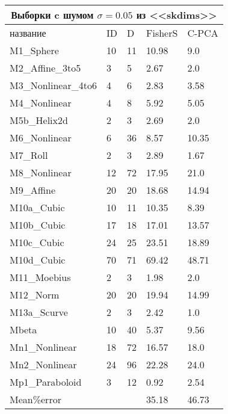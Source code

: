 \documentclass[english, russian]{sobraep}
\begin{document}
\begin{tabular}{
p{2.4cm}|p{0.9cm}|p{0.9cm}|p{0.9cm}|p{0.9cm}  }
 \multicolumn{5}{c}{Выборки c шумом $\sigma = 0.05$ из <<skdims>>} \\
 \hline
 название & ID & D & FisherS& C-PCA\\
 \hline
 M1_Sphere   & 10 & 11 & 10.98 & 9.0\\
M2_Affine_3to5   & 3 & 5 & 2.67 & 2.0\\
M3_Nonlinear_4to6   & 4 & 6 & 2.83 & 3.58\\
M4_Nonlinear   & 4 & 8 & 5.92 & 5.05\\
M5b_Helix2d   & 2 & 3 & 2.69 & 2.0\\
M6_Nonlinear   & 6 & 36 & 8.57 & 10.35\\
M7_Roll   & 2 & 3 & 2.89 & 1.67\\
M8_Nonlinear   & 12 & 72 & 17.95 & 21.0\\
M9_Affine   & 20 & 20 & 18.68 & 14.94\\
M10a_Cubic   & 10 & 11 & 10.35 & 8.39\\
M10b_Cubic   & 17 & 18 & 17.01 & 13.57\\
M10c_Cubic   & 24 & 25 & 23.51 & 18.89\\
M10d_Cubic   & 70 & 71 & 69.42 & 48.71\\
M11_Moebius   & 2 & 3 & 1.98 & 2.0\\
M12_Norm   & 20 & 20 & 19.94 & 14.99\\
M13a_Scurve   & 2 & 3 & 2.42 & 1.0\\
Mbeta   & 10 & 40 & 5.37 & 9.56\\
Mn1_Nonlinear   & 18 & 72 & 16.57 & 18.0\\
Mn2_Nonlinear   & 24 & 96 & 22.28 & 24.0\\
Mp1_Paraboloid   & 3 & 12 & 0.92 & 2.54\\
\hline
Mean\%error & & & 35.18 & 46.73\\
 \hline
 
\end{tabular}
\end{document}
